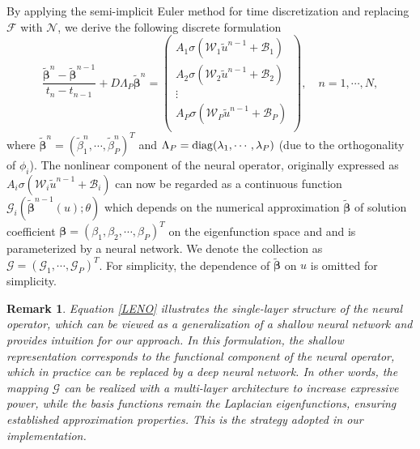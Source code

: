 \documentclass[preprint,12pt]{elsarticle}
\theoremstyle{plain}
\newtheorem{remark}{Remark}[section]
\numberwithin{figure}{section}
\numberwithin{table}{section}
\newcommand{\jddd}[1]{{\color{black}#1}}
\begin{document}
By applying the semi-implicit Euler method for time discretization and replacing  $\mathcal{F}$  with  $\mathcal{N}$, we derive the following discrete formulation
\jddd{\begin{equation}\label{eq:discrete}
	\frac{\widetilde{\bm{\beta}}^n-\widetilde{\bm{\beta}}^{n-1}}{ t_n-t_{n-1}}+D\Lambda_P\widetilde{\bm{\beta}}^n =\begin{pmatrix}
	    {A}_1 \sigma\left(\mathcal{W}_1 \widetilde{u}^{n-1} + \mathcal{B}_1\right)\\
        {A}_2 \sigma\left(\mathcal{W}_2 \widetilde{u}^{n-1} + \mathcal{B}_2\right)\\
        \vdots\\
        {A}_P \sigma\left(\mathcal{W}_P \widetilde{u}^{n-1} + \mathcal{B}_P\right)\\
	\end{pmatrix} , \quad  n=1,\cdots,N,
\end{equation}}
where $\bm{\widetilde{\beta}}^n=(\widetilde{\beta}_1^{n},\cdots,\widetilde{\beta}_P^{n})^T$ and $\Lambda_P = {\rm diag}(\lambda_1,\cdots,\lambda_P)$ (due to the orthogonality of $\phi_i$). The nonlinear component of the neural operator, originally expressed as ${A}_i\sigma(\mathcal{W}_i\widetilde{u}^{n-1}+\mathcal{B}_i)$ can now be regarded as a continuous function $\mathcal{G}_i(\widetilde{\bm\beta}^{n-1}(u);\theta)$ which depends on the numerical approximation $\widetilde{\bm \beta}$ of solution coefficient $\bm\beta=(\beta_1,\beta_2,\cdots,\beta_P)^T$ on the eigenfunction space and and is parameterized by a neural network.  We denote the collection as $\mathcal{G}=(\mathcal{G}_1,\cdots,\mathcal{G}_P)^T$. For simplicity, the dependence of $\bm{\widetilde{\beta}}$ on $u$ is omitted for simplicity.

\jddd{
\begin{remark}
Equation \eqref{LENO} illustrates the single-layer structure of the neural operator, which can be viewed as a generalization of a shallow neural network and provides intuition for our approach. In this formulation, the shallow representation corresponds to the functional component of the neural operator, which in practice can be replaced by a deep neural network. In other words, the mapping $\mathcal{G}$ can be realized with a multi-layer architecture to increase expressive power, while the basis functions remain the Laplacian eigenfunctions, ensuring established approximation properties. This is the strategy adopted in our implementation.
\end{remark}

}
\end{document}
